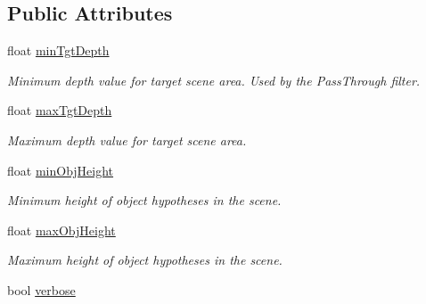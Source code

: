 \subsection*{Public Attributes}
\begin{DoxyCompactItemize}
\item 
\hypertarget{classope_1_1_o_p_e_settings_ade8f054a9fcc8a505b342f2419e012c2}{float \hyperlink{classope_1_1_o_p_e_settings_ade8f054a9fcc8a505b342f2419e012c2}{min\-Tgt\-Depth}}\label{classope_1_1_o_p_e_settings_ade8f054a9fcc8a505b342f2419e012c2}

\begin{DoxyCompactList}\small\item\em Minimum depth value for target scene area. Used by the {\ttfamily Pass\-Through} filter. \end{DoxyCompactList}\item 
\hypertarget{classope_1_1_o_p_e_settings_afe86956ac6beab2b1d3b638f806c430f}{float \hyperlink{classope_1_1_o_p_e_settings_afe86956ac6beab2b1d3b638f806c430f}{max\-Tgt\-Depth}}\label{classope_1_1_o_p_e_settings_afe86956ac6beab2b1d3b638f806c430f}

\begin{DoxyCompactList}\small\item\em Maximum depth value for target scene area. \end{DoxyCompactList}\item 
\hypertarget{classope_1_1_o_p_e_settings_a19059ec550d0de48a83079a905bbfa7f}{float \hyperlink{classope_1_1_o_p_e_settings_a19059ec550d0de48a83079a905bbfa7f}{min\-Obj\-Height}}\label{classope_1_1_o_p_e_settings_a19059ec550d0de48a83079a905bbfa7f}

\begin{DoxyCompactList}\small\item\em Minimum height of object hypotheses in the scene. \end{DoxyCompactList}\item 
\hypertarget{classope_1_1_o_p_e_settings_a704d4f7a1ff1bb754e2c83a0fa99790b}{float \hyperlink{classope_1_1_o_p_e_settings_a704d4f7a1ff1bb754e2c83a0fa99790b}{max\-Obj\-Height}}\label{classope_1_1_o_p_e_settings_a704d4f7a1ff1bb754e2c83a0fa99790b}

\begin{DoxyCompactList}\small\item\em Maximum height of object hypotheses in the scene. \end{DoxyCompactList}\item 
\hypertarget{classope_1_1_o_p_e_settings_abcada89698ac7dbb0833d02d579aad1c}{bool \hyperlink{classope_1_1_o_p_e_settings_abcada89698ac7dbb0833d02d579aad1c}{verbose}}\label{classope_1_1_o_p_e_settings_abcada89698ac7dbb0833d02d579aad1c}


\end{DoxyCompactItemize}
